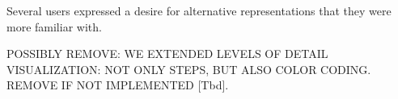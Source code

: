 \documentclass[review,journal]{vgtc}         %
\begin{document}
Several users expressed a desire for alternative representations that they were more familiar with. 

POSSIBLY REMOVE: WE EXTENDED LEVELS OF DETAIL VISUALIZATION: NOT ONLY STEPS, BUT ALSO COLOR CODING. REMOVE IF NOT IMPLEMENTED [Tbd].






\end{document}
